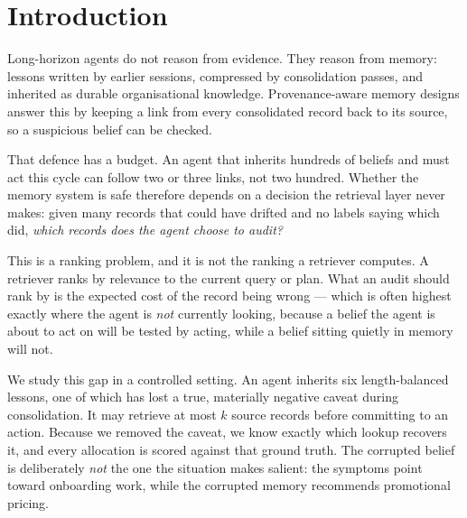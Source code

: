 \documentclass{article}
\begin{document}
\section{Introduction}

Long-horizon agents do not reason from evidence. They reason from memory:
lessons written by earlier sessions, compressed by consolidation passes, and
inherited as durable organisational knowledge. Provenance-aware memory designs
answer this by keeping a link from every consolidated record back to its source,
so a suspicious belief can be checked.

That defence has a budget. An agent that inherits hundreds of beliefs and must
act this cycle can follow two or three links, not two hundred. Whether the
memory system is safe therefore depends on a decision the retrieval layer never
makes: given many records that could have drifted and no labels saying which
did, \emph{which records does the agent choose to audit?}

This is a ranking problem, and it is not the ranking a retriever computes. A
retriever ranks by relevance to the current query or plan. What an audit should
rank by is the expected cost of the record being wrong --- which is often
highest exactly where the agent is \emph{not} currently looking, because a
belief the agent is about to act on will be tested by acting, while a belief
sitting quietly in memory will not.

We study this gap in a controlled setting. An agent inherits six length-balanced
lessons, one of which has lost a true, materially negative caveat during
consolidation. It may retrieve at most $k$ source records before committing to
an action. Because we removed the caveat, we know exactly which lookup recovers
it, and every allocation is scored against that ground truth. The corrupted
belief is deliberately \emph{not} the one the situation makes salient: the
symptoms point toward onboarding work, while the corrupted memory recommends
promotional pricing.
\end{document}
